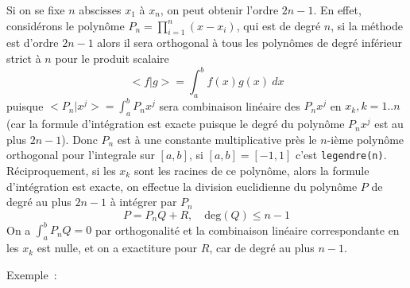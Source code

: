 \documentclass[a4paper,11pt]{article}
\begin{document}
\begin{giacjshere}
Si on se fixe $n$ abscisses $x_1$ \`a $x_n$, on peut obtenir l'ordre
$2n-1$. En effet, consid\'erons le polyn\^ome $P_n=\prod_{i=1}^n (x-x_i)$,
qui est de degr\'e $n$, si la m\'ethode est d'ordre $2n-1$ alors
il sera orthogonal \`a tous les polyn\^omes de degr\'e inf\'erieur
strict \`a $n$ pour le produit scalaire 
$$<f|g>=\int_a^b f(x) g(x) \ dx$$
puisque $<P_n|x^j>=\int_a^b P_n x^j $ sera combinaison lin\'eaire des
$P_n x^j$ en $x_k, k=1..n$ (car la formule d'int\'egration est exacte puisque le degr\'e
du polyn\^ome $P_nx^j$ est au plus $2n-1$). Donc $P_n$ est \`a une constante
multiplicative pr\`es le $n$-i\`eme polyn\^ome orthogonal pour
l'integrale sur $[a,b]$, si $[a,b]=[-1,1]$ c'est \verb|legendre(n)|.
R\'eciproquement, si les $x_k$ sont les racines de ce polyn\^ome,
alors la formule d'int\'egration est exacte, on effectue la division
euclidienne du polyn\^ome $P$ de degr\'e au plus $2n-1$ \`a
int\'egrer par $P_n$
$$ P= P_n Q + R , \quad \mbox{deg}(Q) \leq n-1 $$
On a $\int_a^b P_n Q=0$ par orthogonalit\'e et la combinaison
lin\'eaire correspondante en les $x_k$ est nulle, et on a exactiture
pour $R$, car de degr\'e au plus $n-1$.

Exemple~:
\\
\\


\end{giacjshere}
\end{document}
